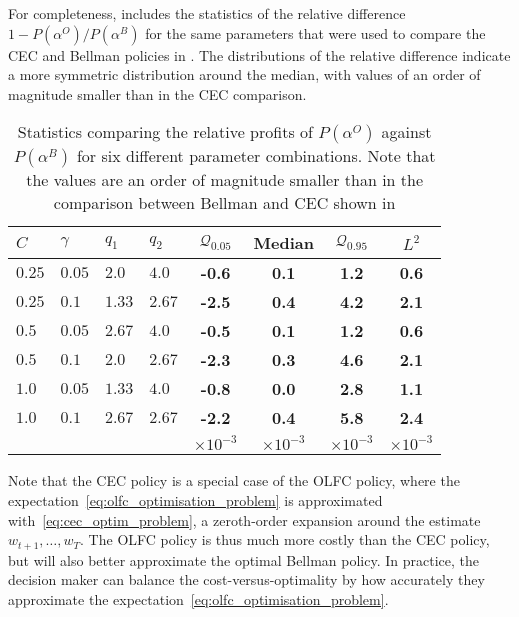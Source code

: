 \documentclass[main.tex]{subfiles}
\begin{document}
For completeness,  includes the statistics of the relative
difference $1-P(\alpha^O)/P(\alpha^B)$ for the same parameters
that were used to compare the CEC and Bellman policies in .
The distributions of the relative difference indicate a more symmetric
distribution around the median, with values of an order of magnitude
smaller than in the CEC comparison.
\begin{table}[htbp]
  \centering
  \begin{tabular}{llllcccc}
    \toprule
    $C$ & $\gamma$ & $q_1$ & $q_2$ & $\mathcal{Q}_{0.05}$
    &Median & $\mathcal{Q}_{0.95}$ &$L^2$\\
    \midrule
    $0.25$ & $0.05$ & $2.0$ & $4.0$
                                   & \textbf{-0.6} & \textbf{0.1} & \textbf{1.2} & \textbf{0.6} \\
    $0.25$ & $0.1$ & $1.33$ & $2.67$
                                   & \textbf{-2.5} & \textbf{0.4} & \textbf{4.2} & \textbf{2.1} \\
    $0.5$ & $0.05$ & $2.67$ & $4.0$
                                   & \textbf{-0.5} & \textbf{0.1} & \textbf{1.2} & \textbf{0.6} \\
    $0.5$ & $0.1$ & $2.0$ & $2.67$
                                   & \textbf{-2.3} & \textbf{0.3} & \textbf{4.6} & \textbf{2.1} \\
    $1.0$ & $0.05$ & $1.33$ & $4.0$
                                   & \textbf{-0.8} & \textbf{0.0} & \textbf{2.8} & \textbf{1.1} \\
    $1.0$ & $0.1$ & $2.67$ & $2.67$
                                   & \textbf{-2.2} & \textbf{0.4} & \textbf{5.8} & \textbf{2.4} \\
        &&&&$\times 10^{-3}$&$\times 10^{-3}$&$\times 10^{-3}$&$\times 10^{-3}$\\
    \bottomrule
  \end{tabular}
  \caption{Statistics comparing the relative profits of $P(\alpha^O)$
    against $P(\alpha^B)$ for six different
    parameter combinations. Note that the values are an order of magnitude
    smaller than in the comparison between Bellman and CEC shown in
    }\label{tbl:paramcomparisons_olfc}
\end{table}

Note that the CEC policy is a special case of the OLFC policy, where the
expectation~\eqref{eq:olfc_optimisation_problem} is approximated with~\eqref{eq:cec_optim_problem}, a zeroth-order expansion around
the estimate $w_{t+1},\dots,w_T$.
The OLFC policy is thus much more costly than the CEC policy, but will
also better approximate the optimal Bellman policy. In practice, the
decision maker can balance the cost-versus-optimality by how
accurately they
approximate the expectation~\eqref{eq:olfc_optimisation_problem}.
\end{document}

